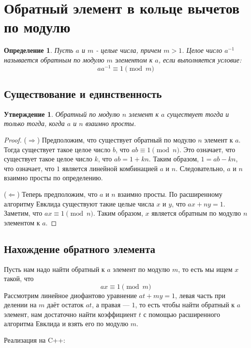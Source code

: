 \documentclass[12pt, a4paper, openany]{book}
\newtheorem*{definition}{Определение}
\newtheorem*{statement}{Утверждение}
\begin{document}
\section{Обратный элемент в кольце вычетов по модулю}

\begin{definition}
Пусть $a$ и $m$ - целые числа, причем $m > 1$. Целое число $a^{-1}$ называется обратным по модулю $m$ элементом к $a$, если выполняется условие:
\[aa^{-1} \equiv 1 \pmod{m}\]
\end{definition}

\newpage
\subsection{Существование и единственность}

\begin{statement}
Обратный по модулю $n$ элемент к $a$ существует тогда и только тогда, когда $a$ и $n$ взаимно просты.
\end{statement}

\begin{proof} 
($\Rightarrow$) Предположим, что существует обратный по модулю $n$ элемент к $a$. Тогда существует такое целое число $b$, что $ab \equiv 1 \pmod{n}$. Это означает, что существует такое целое число $k$, что $ab = 1 + kn$. Таким образом, $1 = ab - kn$, что означает, что $1$ является линейной комбинацией $a$ и $n$. Следовательно, $a$ и $n$ взаимно просты по определению.

($\Leftarrow$) Теперь предположим, что $a$ и $n$ взаимно просты. По расширенному алгоритму Евклида существуют такие целые числа $x$ и $y$, что $ax + ny = 1$. Заметим, что $ax \equiv 1 \pmod{n}$. Таким образом, $x$ является обратным по модулю $n$ элементом к $a$.
\end{proof}

\subsection{Нахождение обратного элемента}

Пусть нам надо найти обратный к $a$ элемент по модулю $m$, то есть мы ищем $x$ такой, что \[ax \equiv 1 \pmod{m}\] 
Рассмотрим линейное диофантово уравнение $at+my=1$, левая часть при делении на $m$ даёт остаток $at$, а правая --- $1$, то есть чтобы найти обратный к $a$ элемент, нам достаточно найти коэффициент $t$ с помощью расширенного алгоритма Евклида и взять его по модулю $m$.

\noindent
Реализация на C++:
\end{document}
